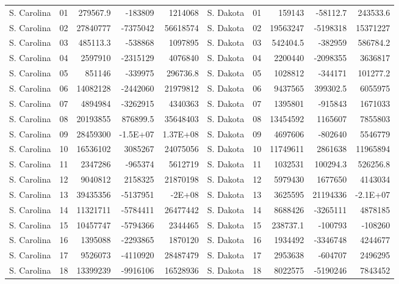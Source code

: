 \begin{landscape}
\begin{singlespace}
\begin{longtable}{lrrrr|lrrrr}
		S. Carolina &  01  & 279567.9 & -183809 & 1214068 & S. Dakota &  01  & 159143 & -58112.7 & 243533.6 \\
		S. Carolina &  02  & 27840777 & -7375042 & 56618574 & S. Dakota &  02  & 19563247 & -5198318 & 15371227 \\
		S. Carolina &  03  & 485113.3 & -538868 & 1097895 & S. Dakota &  03  & 542404.5 & -382959 & 586784.2 \\
		S. Carolina &  04  & 2597910 & -2315129 & 4076840 & S. Dakota &  04  & 2200440 & -2098355 & 3636817 \\
		S. Carolina &  05  & 851146 & -339975 & 296736.8 & S. Dakota &  05  & 1028812 & -344171 & 101277.2 \\
		S. Carolina &  06  & 14082128 & -2442060 & 21979812 & S. Dakota &  06  & 9437565 & 399302.5 & 6055975 \\
		S. Carolina &  07  & 4894984 & -3262915 & 4340363 & S. Dakota &  07  & 1395801 & -915843 & 1671033 \\
		S. Carolina &  08  & 20193855 & 876899.5 & 35648403 & S. Dakota &  08  & 13454592 & 1165607 & 7855803 \\
		S. Carolina &  09  & 28459300 & -1.5E+07 & 1.37E+08 & S. Dakota &  09  & 4697606 & -802640 & 5546779 \\
		S. Carolina &  10 & 16536102 & 3085267 & 24075056 & S. Dakota &  10 & 11749611 & 2861638 & 11965894 \\
		S. Carolina &  11 & 2347286 & -965374 & 5612719 & S. Dakota &  11 & 1032531 & 100294.3 & 526256.8 \\
		S. Carolina &  12 & 9040812 & 2158325 & 21870198 & S. Dakota &  12 & 5979430 & 1677650 & 4143034 \\
		S. Carolina &  13 & 39435356 & -5137951 & -2E+08 & S. Dakota &  13 & 3625595 & 21194336 & -2.1E+07 \\
		S. Carolina &  14 & 11321711 & -5784411 & 26477442 & S. Dakota &  14 & 8688426 & -3265111 & 4878185 \\
		S. Carolina &  15 & 10457747 & -5794366 & 2344465 & S. Dakota &  15 & 238737.1 & -100793 & -108260 \\
		S. Carolina &  16 & 1395088 & -2293865 & 1870120 & S. Dakota &  16 & 1934492 & -3346748 & 4244677 \\
		S. Carolina &  17 & 9526073 & -4110920 & 28487479 & S. Dakota &  17 & 2953638 & -604707 & 2496295 \\
		S. Carolina &  18 & 13399239 & -9916106 & 16528936 & S. Dakota &  18 & 8022575 & -5190246 & 7843452 \\

\end{longtable}
\end{singlespace}
\end{landscape}
